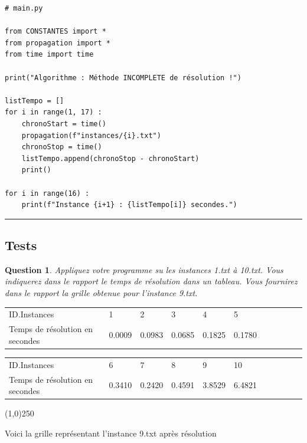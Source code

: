 \documentclass[a4paper,12pt]{article}
\newtheorem{exo}{Question}
\begin{document}
\begin{lstlisting}
# main.py

from CONSTANTES import *
from propagation import *
from time import time

print("Algorithme : Méthode INCOMPLETE de résolution !")

listTempo = []
for i in range(1, 17) :
    chronoStart = time()
    propagation(f"instances/{i}.txt")
    chronoStop = time()
    listTempo.append(chronoStop - chronoStart)
    print()
    
for i in range(16) :
    print(f"Instance {i+1} : {listTempo[i]} secondes.")
\end{lstlisting}

\noindent\rule{\textwidth}{1pt}



\subsection{Tests}

\begin{exo}
	Appliquez votre programme su les instances 1.txt à 10.txt. Vous indiquerez dans le rapport le temps de résolution dans un tableau. Vous fournirez dans le rapport la grille obtenue pour l'instance 9.txt.
\end{exo}

\begin{table}[hbt!]
\centering
\begin{tabular}{|l|l|l|l|l|l|l|l|l|l|l|}
ID.Instances           & 1      & 2      & 3      & 4      & 5  \\
Temps de résolution en secondes & 0.0009 & 0.0983 & 0.0685 & 0.1825 & 0.1780 
\end{tabular}
\end{table}

\begin{table}[hbt!]
\centering
\begin{tabular}{|l|l|l|l|l|l|l|l|l|l|l|}
ID.Instances           & 6      & 7      & 8      & 9      & 10      \\
Temps de résolution en secondes &  0.3410 & 0.2420 & 0.4591 & 3.8529 & 6.4821 
\end{tabular}
\end{table}

 \begin{center}
   \line(1,0){250}
 \end{center}

\begin{center}Voici la grille représentant l'instance 9.txt après résolution\end{center}
\end{document}
